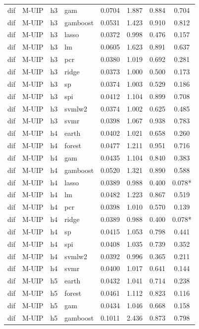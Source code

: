 \begin{ThreePartTable}
\begin{longtable}[t]{llclcccc}
dif & M-UIP & h3 & gam & 0.0704 & 1.887 & 0.884 & 0.704\\
dif & M-UIP & h3 & gamboost & 0.0531 & 1.423 & 0.910 & 0.812\\
dif & M-UIP & h3 & lasso & 0.0372 & 0.998 & 0.476 & 0.157\\
dif & M-UIP & h3 & lm & 0.0605 & 1.623 & 0.891 & 0.637\\
dif & M-UIP & h3 & pcr & 0.0380 & 1.019 & 0.692 & 0.281\\
dif & M-UIP & h3 & ridge & 0.0373 & 1.000 & 0.500 & 0.173\\
dif & M-UIP & h3 & sp & 0.0374 & 1.003 & 0.529 & 0.186\\
dif & M-UIP & h3 & spi & 0.0412 & 1.104 & 0.899 & 0.708\\
dif & M-UIP & h3 & svmlw2 & 0.0374 & 1.002 & 0.625 & 0.485\\
dif & M-UIP & h3 & svmr & 0.0398 & 1.067 & 0.938 & 0.783\\
\addlinespace
dif & M-UIP & h4 & earth & 0.0402 & 1.021 & 0.658 & 0.260\\
dif & M-UIP & h4 & forest & 0.0477 & 1.211 & 0.951 & 0.716\\
dif & M-UIP & h4 & gam & 0.0435 & 1.104 & 0.840 & 0.383\\
dif & M-UIP & h4 & gamboost & 0.0520 & 1.321 & 0.890 & 0.588\\
dif & M-UIP & h4 & lasso & 0.0389 & 0.988 & 0.400 & 0.078*\\
dif & M-UIP & h4 & lm & 0.0482 & 1.223 & 0.867 & 0.519\\
dif & M-UIP & h4 & pcr & 0.0398 & 1.010 & 0.570 & 0.139\\
dif & M-UIP & h4 & ridge & 0.0389 & 0.988 & 0.400 & 0.078*\\
dif & M-UIP & h4 & sp & 0.0415 & 1.053 & 0.798 & 0.441\\
dif & M-UIP & h4 & spi & 0.0408 & 1.035 & 0.739 & 0.352\\
dif & M-UIP & h4 & svmlw2 & 0.0392 & 0.996 & 0.365 & 0.211\\
dif & M-UIP & h4 & svmr & 0.0400 & 1.017 & 0.641 & 0.144\\
\addlinespace
dif & M-UIP & h5 & earth & 0.0432 & 1.041 & 0.714 & 0.238\\
dif & M-UIP & h5 & forest & 0.0461 & 1.112 & 0.823 & 0.116\\
dif & M-UIP & h5 & gam & 0.0434 & 1.046 & 0.668 & 0.158\\
dif & M-UIP & h5 & gamboost & 0.1011 & 2.436 & 0.873 & 0.798\\

\end{longtable}
\end{ThreePartTable}
